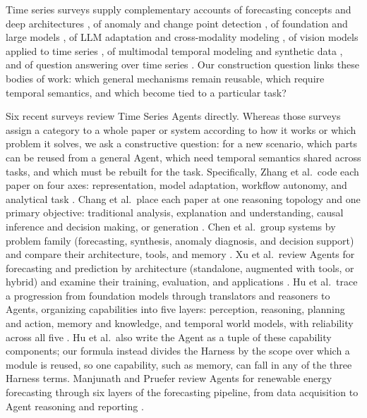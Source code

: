 \documentclass[preprints,article,submit,moreauthors]{Definitions/mdpi}
\begin{document}
Time series surveys supply complementary accounts of forecasting concepts and deep architectures \citep{lim2021deepts,wang2024tslib,cheng2026tsfsurvey}, of anomaly and change point detection \citep{darban2024anomaly,aminikhanghahi2017changepoint}, of foundation and large models \citep{liang2024foundation,ye2024tsfmsurvey,jin2026largemodels}, of LLM adaptation and cross-modality modeling \citep{zhang2024llmts,jiang2024empowering,liu2025crossmodality}, of vision models applied to time series \citep{ni2025harnessingvisionmodelstime}, of multimodal temporal modeling and synthetic data \citep{jiang2025multimodal,liu2025synthetic}, and of question answering over time series \citep{li2026tsqasurvey}. Our construction question links these bodies of work: which general mechanisms remain reusable, which require temporal semantics, and which become tied to a particular task?

Six recent surveys review Time Series Agents directly. Whereas those surveys assign a category to a whole paper or system according to how it works or which problem it solves, we ask a constructive question: for a new scenario, which parts can be reused from a general Agent, which need temporal semantics shared across tasks, and which must be rebuilt for the task. Specifically, Zhang et al.\ code each paper on four axes: representation, model adaptation, workflow autonomy, and analytical task \citep{promptstoagents2026}. Chang et al.\ place each paper at one reasoning topology and one primary objective: traditional analysis, explanation and understanding, causal inference and decision making, or generation \citep{changsurvey2026}. Chen et al.\ group systems by problem family (forecasting, synthesis, anomaly diagnosis, and decision support) and compare their architecture, tools, and memory \citep{chen2026tsagentsurvey}. Xu et al.\ review Agents for forecasting and prediction by architecture (standalone, augmented with tools, or hybrid) and examine their training, evaluation, and applications \citep{xu2026forecastagentsurvey}. Hu et al.\ trace a progression from foundation models through translators and reasoners to Agents, organizing capabilities into five layers: perception, reasoning, planning and action, memory and knowledge, and temporal world models, with reliability across all five \citep{hu2026agenticts}. Hu et al.\ also write the Agent as a tuple of these capability components; our formula instead divides the Harness by the scope over which a module is reused, so one capability, such as memory, can fall in any of the three Harness terms. Manjunath and Pruefer review Agents for renewable energy forecasting through six layers of the forecasting pipeline, from data acquisition to Agent reasoning and reporting \citep{manjunath2026renewableagents}.
\end{document}
